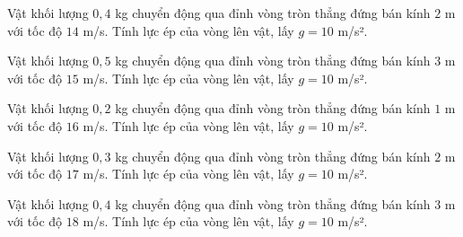 \begin{ex}
Vật khối lượng $0,4$ kg chuyển động qua đỉnh vòng tròn thẳng đứng bán kính $2$ m với tốc độ $14$ m/s. Tính lực ép của vòng lên vật, lấy $g=10$ m/s².
\end{ex}

\begin{ex}
Vật khối lượng $0,5$ kg chuyển động qua đỉnh vòng tròn thẳng đứng bán kính $3$ m với tốc độ $15$ m/s. Tính lực ép của vòng lên vật, lấy $g=10$ m/s².
\end{ex}

\begin{ex}
Vật khối lượng $0,2$ kg chuyển động qua đỉnh vòng tròn thẳng đứng bán kính $1$ m với tốc độ $16$ m/s. Tính lực ép của vòng lên vật, lấy $g=10$ m/s².
\end{ex}

\begin{ex}
Vật khối lượng $0,3$ kg chuyển động qua đỉnh vòng tròn thẳng đứng bán kính $2$ m với tốc độ $17$ m/s. Tính lực ép của vòng lên vật, lấy $g=10$ m/s².
\end{ex}

\begin{ex}
Vật khối lượng $0,4$ kg chuyển động qua đỉnh vòng tròn thẳng đứng bán kính $3$ m với tốc độ $18$ m/s. Tính lực ép của vòng lên vật, lấy $g=10$ m/s².
\end{ex}

